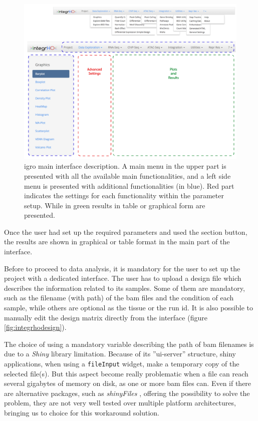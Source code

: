 \begin{figure}[H]
\centering
\includegraphics[width=\textwidth, keepaspectratio]{img/integrho/interface.png}
\caption[\gls{igro} main interface]{\gls{igro} main interface description. A main menu in the upper part is presented with all the available main functionalities, and a left side menu is presented with additional functionalities (in blue). Red part indicates the settings for each functionality within the parameter setup. While in green results in table or graphical form are presented.}
\label{fig:integrhomain}
\end{figure}

Once the user had set up the required parameters and used the section button, the results are shown in graphical or table format in the main part of the interface.

Before to proceed to data analysis, it is mandatory for the user to set up the project with a dedicated interface. 
The user has to upload a design file which describes the information related to its samples.
Some of them are mandatory, such as the filename (with path) of the \gls{bam} files and the condition of each sample, while others are optional as the tissue or the run id. 
It is also possible to manually edit the design matrix directly from the interface (figure \ref{fig:integrhodesign}).

The choice of using a mandatory variable describing the path of  \gls{bam} filenames is due to a \textit{Shiny} library limitation. 
Because of its ''ui-server'' structure, shiny applications, when using a \lstinline!fileInput! widget, make a temporary copy of the selected file(s).
But this aspect become really problematic when a file can reach several gigabytes of memory on disk, as one or more \gls{bam} files can.
Even if there are alternative packages, such as \textit{shinyFiles} \cite{Pedersen}, offering the possibility to solve the problem, they are not very well tested over multiple platform architectures, bringing us to choice for this workaround solution.


